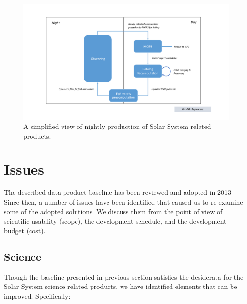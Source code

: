 \documentclass[DM,authoryear,toc,lsstdraft]{lsstdoc}
\begin{document}
\begin{figure}
	\caption{A simplified view of nightly production of Solar System related products.\label{fig:productionNow}}
	\centering
	\includegraphics[page=1,width=1.0\textwidth]{figures/processing.pdf}
\end{figure}

\section{Issues}

The described data product baseline has been reviewed and adopted in 2013. Since then, a number of issues have been identified that caused us to re-examine some of the adopted solutions. We discuss them from the point of view of scientific usability (scope), the development schedule, and the development budget (cost).

\subsection{Science}

Though the baseline presented in previous section satisfies the desiderata for the Solar System science related products, we have identified elements that can be improved. Specifically:
\end{document}
